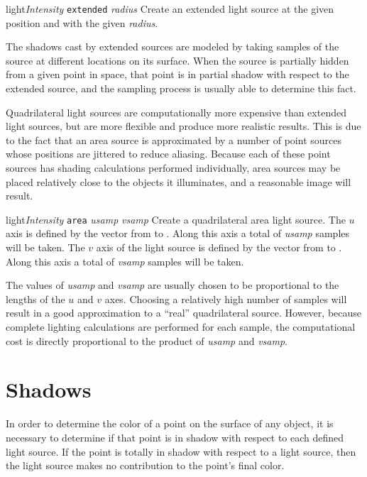 \begin{defkey}{light}{{\em Intensity\/} {\tt extended} {\em radius}  }
	Create an extended light source at the given position and with
	the given {\em radius}.
\end{defkey}
The shadows cast by
extended sources are modeled by taking samples of the source at
different locations on its surface.  When the source is partially
hidden from a given point in space, that point is in partial shadow
with respect to the extended source, and the sampling process is
usually able to determine this fact.

Quadrilateral light sources are computationally more expensive than extended
light sources, but are more flexible and produce more realistic results.
This is due to the fact that an area source is approximated by a
number of point sources whose positions are jittered to reduce aliasing.
Because each of these point sources has shading calculations performed
individually, area sources may be placed relatively close to the
objects it illuminates, and a reasonable image will result.

\begin{defkey}{light}{{\em Intensity\/} {\tt area}   {\em usamp}
	 {\em vsamp}}
	Create a quadrilateral area light source.
	The $u$ axis
	is defined by the vector from  to .  Along
	this axis a total of {\em usamp} samples will be taken.
	The $v$ axis of the light source is defined by the vector
	from  to .  Along this axis a total of
	{\em vsamp} samples will be taken.
\end{defkey}
The values of {\em usamp} and {\em vsamp} are usually chosen to be
proportional to the lengths of the $u$ and $v$ axes.  Choosing a
relatively high number of samples will result in a good approximation
to a ``real'' quadrilateral source.  However, because complete
lighting calculations are performed for each sample,
the computational cost is directly proportional to the product
of {\em usamp} and {\em vsamp}.

\section{Shadows}

In order to determine the color of a point on the surface
of any object, it is necessary
to determine if that point is in shadow with respect to each
defined light source.  If the point is totally in shadow with respect to
a light source, then the light source makes no contribution to the
point's final color.


